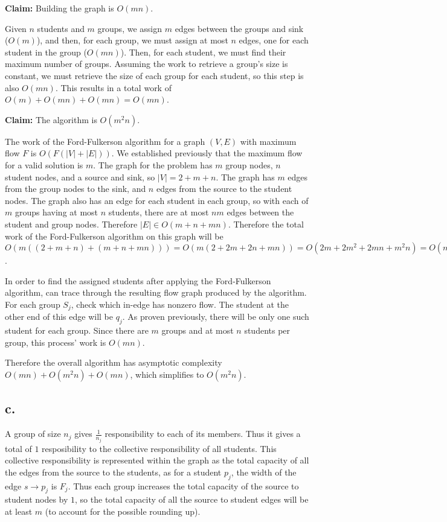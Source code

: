 \documentclass{article}
\begin{document}
\textbf{Claim:} Building the graph is $O(mn)$.

Given $n$ students and $m$ groups, we assign $m$ edges between the groups and sink ($O(m)$), and then, for each group, we must assign at most $n$ edges, one for each student in the group ($O(mn)$). Then, for each student, we must find their maximum number of groups. Assuming the work to retrieve a group's size is constant, we must retrieve the size of each group for each student, so this step is also $O(mn)$. This results in a total work of $O(m) + O(mn) + O(mn) = O(mn)$. 

\textbf{Claim: } The algorithm is $O(m^2n)$.

The work of the Ford-Fulkerson algorithm for a graph $(V, E)$ with maximum flow $F$ is $O(F(|V| + |E|))$. We established previously that the maximum flow for a valid solution is $m$. The graph for the problem has $m$ group nodes, $n$ student nodes, and a source and sink, so $|V| = 2 + m + n$. The graph has $m$ edges from the group nodes to the sink, and $n$ edges from the source to the student nodes. The graph also has an edge for each student in each group, so with each of $m$ groups having at most $n$ students, there are at most $nm$ edges between the student and group nodes. Therefore $|E| \in O(m + n + mn)$. Therefore the total work of the Ford-Fulkerson algorithm on this graph will be $O(m ((2 + m + n) + (m + n + mn))) = O(m(2 + 2m + 2n + mn)) = O(2m + 2m^2 + 2mn + m^2n) = O(m^2n)$.

In order to find the assigned students after applying the Ford-Fulkerson algorithm, can trace through the resulting flow graph produced by the algorithm. For each group $S_j$, check which in-edge has nonzero flow. The student at the other end of this edge will be $q_j$. As proven previously, there will be only one such student for each group. Since there are $m$ groups and at most $n$ students per group, this process' work is $O(mn)$.

Therefore the overall algorithm has asymptotic complexity $O(mn) + O(m^2n) + O(mn)$, which simplifies to $O(m^2n)$.

\subsection*{c.}

A group of size $n_j$ gives $\frac{1}{n_j}$ responsibility to each of its members. Thus it gives a total of $1$ resposibility to the collective responsibility of all students. This collective responsibility is represented within the graph as the total capacity of all the edges from the source to the students, as for a student $p_j$, the width of the edge $s \rightarrow p_j$ is $F_j$. Thus each group increases the total capacity of the source to student nodes by $1$, so the total capacity of all the source to student edges will be at least $m$ (to account for the possible rounding up). 
\end{document}
